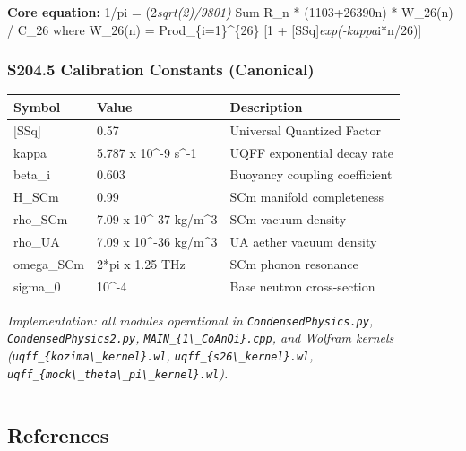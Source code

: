 \textbf{Core equation:} 1/pi = (2\emph{sqrt(2)/9801) } Sum R\_n *
(1103+26390n) * W\_26(n) / C\_26 where W\_26(n) =
Prod\_\{i=1\}\^{}\{26\} {[}1 + {[}SSq{]}\emph{exp(-kappa}i*n/26){]}

\subsubsection{S204.5 Calibration Constants
(Canonical)}\label{s204.5-calibration-constants-canonical}

{\def\LTcaptype{none} %
\begin{longtable}[]{@{}lll@{}}
\toprule\noalign{}
Symbol & Value & Description \\
\midrule\noalign{}
\endhead
\bottomrule\noalign{}
\endlastfoot
{[}SSq{]} & 0.57 & Universal Quantized Factor \\
kappa & 5.787 x 10\^{}-9 s\^{}-1 & UQFF exponential decay rate \\
beta\_i & 0.603 & Buoyancy coupling coefficient \\
H\_SCm & 0.99 & SCm manifold completeness \\
rho\_SCm & 7.09 x 10\^{}-37 kg/m\^{}3 & SCm vacuum density \\
rho\_UA & 7.09 x 10\^{}-36 kg/m\^{}3 & UA aether vacuum density \\
omega\_SCm & 2*pi x 1.25 THz & SCm phonon resonance \\
sigma\_0 & 10\^{}-4 & Base neutron cross-section \\
\end{longtable}
}

\emph{Implementation: all modules operational in
\texttt{CondensedPhysics.py}, \texttt{CondensedPhysics2.py},
\texttt{MAIN\_\{1\textbackslash{}\_CoAnQi\}.cpp}, and Wolfram kernels
(\texttt{uqff\_\{kozima\textbackslash{}\_kernel\}.wl},
\texttt{uqff\_\{s26\textbackslash{}\_kernel\}.wl},
\texttt{uqff\_\{mock\textbackslash{}\_theta\textbackslash{}\_pi\textbackslash{}\_kernel\}.wl}).}

\begin{center}\rule{0.5\linewidth}{0.5pt}\end{center}

\subsection{References}\label{references-1}

